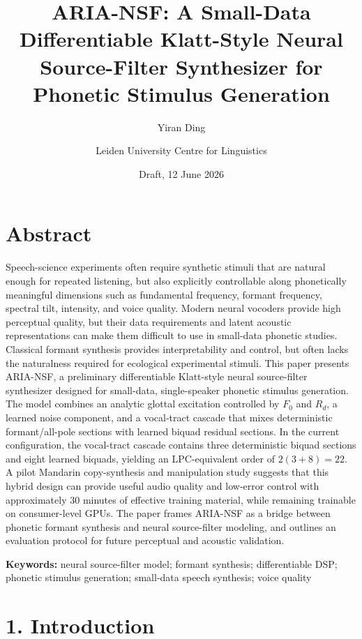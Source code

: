 \documentclass[
  10pt,
]{article}
\title{ARIA-NSF: A Small-Data Differentiable Klatt-Style Neural
Source-Filter Synthesizer for Phonetic Stimulus Generation}
\author{Yiran Ding \and Leiden University Centre for Linguistics}
\date{Draft, 12 June 2026}
\begin{document}
\maketitle

\section{Abstract}\label{abstract}

Speech-science experiments often require synthetic stimuli that are
natural enough for repeated listening, but also explicitly controllable
along phonetically meaningful dimensions such as fundamental frequency,
formant frequency, spectral tilt, intensity, and voice quality. Modern
neural vocoders provide high perceptual quality, but their data
requirements and latent acoustic representations can make them difficult
to use in small-data phonetic studies. Classical formant synthesis
provides interpretability and control, but often lacks the naturalness
required for ecological experimental stimuli. This paper presents
ARIA-NSF, a preliminary differentiable Klatt-style neural source-filter
synthesizer designed for small-data, single-speaker phonetic stimulus
generation. The model combines an analytic glottal excitation controlled
by \(F_0\) and \(R_d\), a learned noise component, and a vocal-tract
cascade that mixes deterministic formant/all-pole sections with learned
biquad residual sections. In the current configuration, the vocal-tract
cascade contains three deterministic biquad sections and eight learned
biquads, yielding an LPC-equivalent order of \(2(3+8)=22\). A pilot
Mandarin copy-synthesis and manipulation study suggests that this hybrid
design can provide useful audio quality and low-error control with
approximately 30 minutes of effective training material, while remaining
trainable on consumer-level GPUs. The paper frames ARIA-NSF as a bridge
between phonetic formant synthesis and neural source-filter modeling,
and outlines an evaluation protocol for future perceptual and acoustic
validation.

\textbf{Keywords:} neural source-filter model; formant synthesis;
differentiable DSP; phonetic stimulus generation; small-data speech
synthesis; voice quality

\section{1. Introduction}\label{introduction}
\end{document}
